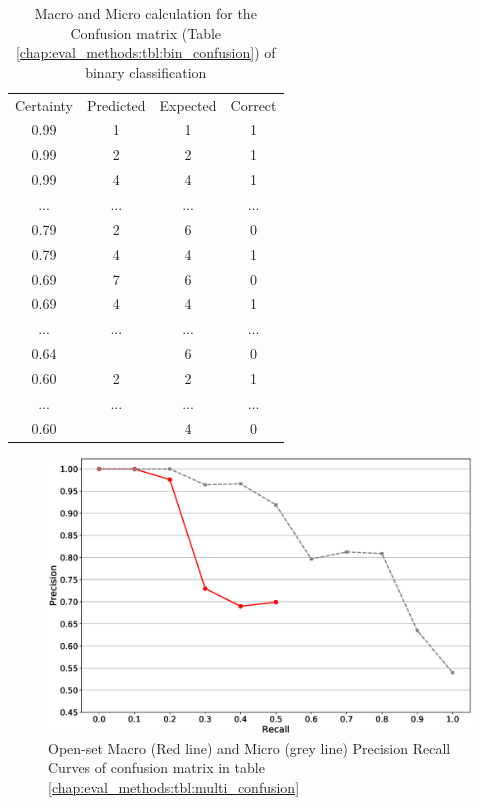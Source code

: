 \begin{table}[H]
	\center
	\caption{Macro and Micro calculation for the Confusion matrix (Table \ref{chap:eval_methods:tbl:bin_confusion}) of binary classification}\label{chap:eval_methods:tbl:bin_macro_vs_micro}
	\begin{tabular}{|c|c|c|c|}
		\cline{1-4}
		Certainty & Predicted & Expected & Correct\\
		\cline{1-4}
		0.99 & 1 & 1 & 1 \\
		0.99 & 2 & 2 & 1 \\
		0.99 & 4 & 4 & 1 \\
		... & ... & ... & ... \\
		0.79 & 2 & 6 & 0 \\
		0.79 & 4 & 4 & 1 \\
		0.69 & 7 & 6 & 0 \\
		0.69 & 4 & 4 & 1 \\
		... & ... & ... & ... \\
		0.64 & \emptyset & 6 & 0 \\
		0.60 & 2 & 2 & 1 \\
		... & ... & ... & ... \\
		0.60 & \emptyset & 4 & 0 \\
		\cline{1-4}
	\end{tabular}
\end{table}



\begin{figure}[t]
	\begin{center}
    	\includegraphics[scale=0.45]{Figures/pr_macro_micro_example.eps}
		\caption{Open-set Macro (Red line) and Micro (grey line) Precision Recall Curves of confusion matrix in table \ref{chap:eval_methods:tbl:multi_confusion}}
		\label{chap:eval_methods:tbl:prc_macro}
	\end{center}
\end{figure}


